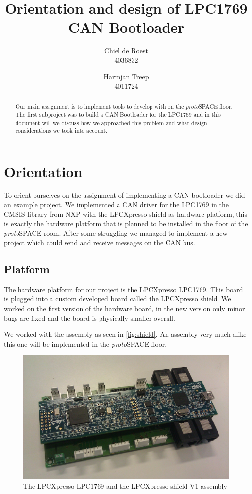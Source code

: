 \documentclass[twocolumn]{article}
\title{Orientation and design of LPC1769 CAN Bootloader}
\author{Chiel de Roest\\4036832 \and Harmjan Treep\\4011724}
\date{}
\newcommand{\protospace}{\textit{proto}SPACE }
\begin{document}
\maketitle

\begin{abstract}
	Our main assignment is to implement tools to develop with on the \protospace floor.
	The first subproject was to build a CAN Bootloader for the LPC1769 and in this document will we discuss how we approached this problem and what design considerations we took into account.
\end{abstract}

\section*{Orientation}
	To orient ourselves on the assignment of implementing a CAN bootloader we did an example project.
	We implemented a CAN driver for the LPC1769 in the CMSIS library from NXP with the LPCXpresso shield as hardware platform,
	this is exactly the hardware platform that is planned to be installed in the floor of the \protospace room.
	After some struggling we managed to implement a new project which could send and receive messages on the CAN bus.
	
	\subsection*{Platform}
		The hardware platform for our project is the LPCXpresso LPC1769.
		This board is plugged into a custom developed board called the LPCXpresso shield.
		We worked on the first version of the hardware board,
		in the new version only minor bugs are fixed and the board is physically smaller overall.
		
		We worked with the assembly as seen in \autoref{fig:shield}.
		An assembly very much alike this one will be implemented in the \protospace floor.
		\begin{figure}[htbp]
			\centering
			\includegraphics[width=\columnwidth]{LPCXpressoShieldAssembly}
			\caption{The LPCXpresso LPC1769 and the LPCXpresso shield V1 assembly}
			\label{fig:shield}
		\end{figure}
		
\end{document}
